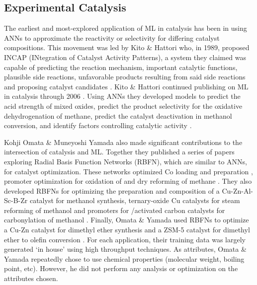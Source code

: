 	\subsection{Experimental Catalysis}
	The earliest and most-explored application of ML in catalysis has been in using ANNs to approximate the reactivity or selectivity for differing catalyst compositions. This movement was led by Kito \& Hattori who, in 1989, proposed INCAP (INtegration of Catalyst Activity Patterns), a system they claimed was capable of predicting the reaction mechanism, important catalytic functions, plausible side reactions, unfavorable products resulting from said side reactions and proposing catalyst candidates \cite{Kito_1989}. Kito \& Hattori continued publishing on ML in catalysis through 2006 \cite{Kito_2006}. Using ANNs they developed models to predict the acid strength of mixed oxides, predict the product selectivity for the oxidative dehydrogenation of methane, predict the catalyst deactivation in methanol conversion, and identify factors controlling catalytic activity \cite{Kito_1991,Kito_1994,Kito_2004,Kito_2006}. 

	Kohji Omata \& Muneyoshi Yamada also made significant contributions to the intersection of catalysis and ML. Together they published a series of papers exploring Radial Basis Function Networks (RBFN), which are similar to ANNs, for catalyst optimization. These networks optimized Co loading and preparation \cite{Omata_2006_1}, promoter optimization for oxidation of  and dry reforming of methane \cite{Omata_2009,Omata_2007,Omata_2010}. They also developed RBFNs for optimizing the preparation and composition of a Cu-Zn-Al-Sc-B-Zr catalyst for methanol synthesis, ternary-oxide Cu catalysts for steam reforming of methanol and promoters for /activated carbon catalysts for carbonylation of methanol \cite{Omata_2004,Omata_2004_2,Omata_2008}. Finally, Omata \& Yamada used RBFNs to optimize a Cu-Zn catalyst for dimethyl ether synthesis and a ZSM-5 catalyst for dimethyl ether to olefin conversion \cite{Omata_2006_2,Omata_2009_2}. For each application, their training data was largely generated `in house' using high throughput techniques. As attributes, Omata \& Yamada repeatedly chose to use chemical properties (molecular weight, boiling point, etc). However, he did not perform any analysis or optimization on the attributes chosen. 

